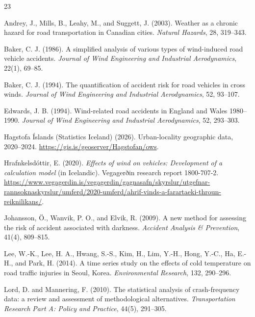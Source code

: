 \begin{thebibliography}{23}

Andrey, J., Mills, B., Leahy, M., and Suggett, J. (2003).
\newblock Weather as a chronic hazard for road transportation in Canadian cities.
\newblock \emph{Natural Hazards}, 28, 319--343.

Baker, C. J. (1986).
\newblock A simplified analysis of various types of wind-induced road vehicle
accidents.
\newblock \emph{Journal of Wind Engineering and Industrial Aerodynamics}, 22(1), 69--85.

Baker, C. J. (1994).
\newblock The quantification of accident risk for road vehicles in cross winds.
\newblock \emph{Journal of Wind Engineering and Industrial Aerodynamics}, 52, 93--107.

Edwards, J. B. (1994).
\newblock Wind-related road accidents in England and Wales 1980--1990.
\newblock \emph{Journal of Wind Engineering and Industrial Aerodynamics}, 52, 293--303.

Hagstofa Íslands (Statistics Iceland) (2026).
\newblock Urban-locality geographic data, 2020--2024.
\newblock \url{https://gis.is/geoserver/Hagstofan/ows}.

Hrafnkelsdóttir, E. (2020).
\newblock \emph{Effects of wind on vehicles: Development of a calculation model}
(in Icelandic).
\newblock Vegagerðin research report 1800-707-2.
\newblock \url{https://www.vegagerdin.is/vegagerdin/gagnasafn/skyrslur/utgefnar-rannsoknaskyrslur/umferd/2020-umferd/ahrif-vinds-a-farartaeki-throun-reiknilikans/}.

Johansson, \"O., Wanvik, P. O., and Elvik, R. (2009).
\newblock A new method for assessing the risk of accident associated with darkness.
\newblock \emph{Accident Analysis \& Prevention}, 41(4), 809--815.

Lee, W.-K., Lee, H. A., Hwang, S.-S., Kim, H., Lim, Y.-H., Hong, Y.-C.,
Ha, E.-H., and Park, H. (2014).
\newblock A time series study on the effects of cold temperature on road
traffic injuries in Seoul, Korea.
\newblock \emph{Environmental Research}, 132, 290--296.

Lord, D. and Mannering, F. (2010).
\newblock The statistical analysis of crash-frequency data: a review and
assessment of methodological alternatives.
\newblock \emph{Transportation Research Part A: Policy and Practice},
44(5), 291--305.


\end{thebibliography}
